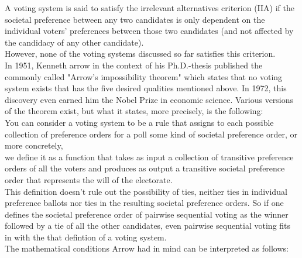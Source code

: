 A voting system is said to satisfy the irrelevant alternatives criterion (IIA) if the societal preference between any two candidates is only dependent on the individual voters' preferences between those two candidates (and not affected by the candidacy of any other candidate). \\
However, none of the voting systems discussed so far satisfies this criterion. \\
In 1951, Kenneth arrow in the context of his Ph.D.-thesis published the commonly called "Arrow's impossibility theorem" which states that no voting system exists that has the five desired qualities mentioned above. In 1972, this discovery even earned him the Nobel Prize in economic science. Various versions of the theorem exist, but what it states, more precisely, is the following: \\
You can consider a voting system to be a rule that assigns to each possible collection of preference orders for a poll some kind of societal preference order, or more concretely, \\
we define it as a function that takes as input a collection of transitive preference orders of all the voters and produces as output a transitive societal preference order that represents the will of the electorate. \\
This definition doesn't rule out the possibility of ties, neither ties in individual preference ballots nor ties in the resulting societal preference orders. So if one defines the societal preference order of pairwise sequential voting as the winner followed by a tie of all the other candidates, even pairwise sequential voting fits in with the that defintion of a voting system. \\
The mathematical conditions Arrow had in mind can be interpreted as follows: 
